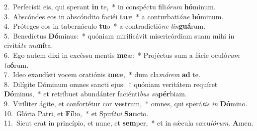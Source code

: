 {2.~}Perfecísti eis, qui sperant \textbf{in} te,~* in conspéctu fili\textit{ó}\textit{rum} \textbf{hó}minum.\\
{3.~}Abscóndes eos in abscóndito faciéi \textbf{tu}æ~* a conturbati\textit{ó}\textit{ne} \textbf{hó}minum.\\
{4.~}Próteges eos in tabernáculo \textbf{tu}o~* a contradictió\textit{ne} \textit{lin}\textbf{guá}rum.\\
{5.~}Benedíctus \textbf{Dó}minus:~* quóniam mirificávit misericórdiam suam mihi in civitá\textit{te} \textit{mu}\textbf{ní}ta.\\
{6.~}Ego autem dixi in excéssu mentis \textbf{me}æ:~* Projéctus sum a fácie oculó\textit{rum} \textit{tu}\textbf{ó}rum.\\
{7.~}Ideo exaudísti vocem oratiónis \textbf{me}æ,~* dum cla\textit{má}\textit{rem} \textbf{ad} te.\\
{8.~}Dilígite Dóminum omnes sancti ejus:~† quóniam veritátem requíret \textbf{Dó}minus,~* et retríbuet abundánter faciénti\textit{bus} \textit{su}\textbf{pér}biam.\\
{9.~}Viríliter ágite, et confortétur cor \textbf{ve}strum,~* omnes, qui sperá\textit{tis} \textit{in} \textbf{Dó}mino.\\
{10.~}Glória Patri, et \textbf{Fí}lio,~* et Spirí\textit{tu}\textit{i} \textbf{San}cto.\\
{11.~}Sicut erat in princípio, et nunc, et \textbf{sem}per,~* et in sǽcula sæcu\textit{ló}\textit{rum}. \textbf{A}men.\\
